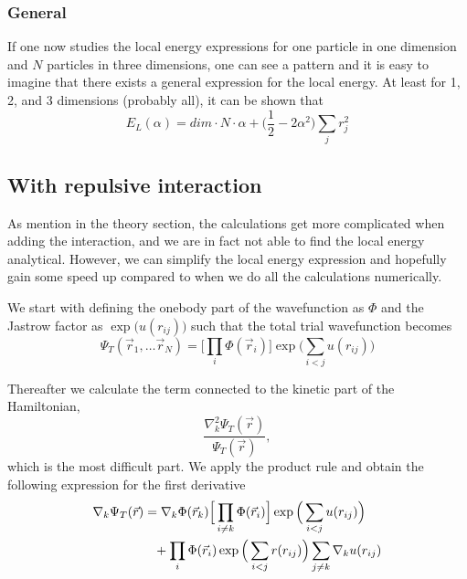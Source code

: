 \documentclass[norsk,a4paper,12pt]{article}
\begin{document}
\subsubsection{General}
If one now studies the local energy expressions for one particle in one dimension and $N$ particles in three dimensions, one can see a pattern and it is easy to imagine that there exists a general expression for the local energy. At least for 1, 2, and 3 dimensions (probably all), it can be shown that
\begin{equation}
E_L(\alpha)=dim\cdot N\cdot \alpha+\Big(\frac{1}{2}-2\alpha^2\Big)\sum_jr_j^2
\end{equation}

\subsection{With repulsive interaction}
As mention in the theory section, the calculations get more complicated when adding the interaction, and we are in fact not able to find the local energy analytical. However, we can simplify the local energy expression and hopefully gain some speed up compared to when we do all the calculations numerically. 

We start with defining the onebody part of the wavefunction as $\Phi$ and the Jastrow factor as $\exp\big(u(r_{ij})\big)$ such that the total trial wavefunction becomes
\begin{equation}
\Psi_T(\vec{r}_1,\hdots\vec{r}_N)=\Big[\prod_i\Phi(\vec{r}_i)\Big]\exp\Big(\sum_{i<j}u(r_{ij})\Big)
\end{equation}

Thereafter we calculate the term connected to the kinetic part of the Hamiltonian,
\begin{equation}
\frac{\nabla_k^2\Psi_T(\vec{r})}{\Psi_T(\vec{r})},
\label{eq:ham_kin}
\end{equation}
which is the most difficult part. We apply the product rule and obtain the following expression for the first derivative
\begin{align}
\nabla_k\Psi_T(\vec{r})&=\nabla_k\Phi(\vec{r}_k)\Big[\prod_{i\neq k}\Phi(\vec{r}_i)\Big]\exp\Big(\sum_{i<j}u(r_{ij})\Big)\notag\\
&\phantom{=}+\prod_i\Phi(\vec{r}_i)\exp\Big(\sum_{i<j}r(r_{ij})\Big)
\sum_{j\neq k}\nabla_k u(r_{ij})
\end{align}
\end{document}
